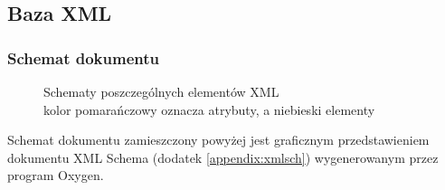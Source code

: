 \subsection{Baza XML}

\subsubsection{Schemat dokumentu}

\begin{figure}[h]
 \centering
 \caption[Schematy poszczególnych elementów XML]{Schematy poszczególnych elementów XML\\ \footnotesize{kolor pomarańczowy oznacza atrybuty, a niebieski elementy}}
\end{figure}



Schemat dokumentu zamieszczony powyżej jest graficznym przedstawieniem dokumentu XML Schema (dodatek \ref{appendix:xmlsch}) 
wygenerowanym przez program Oxygen.

